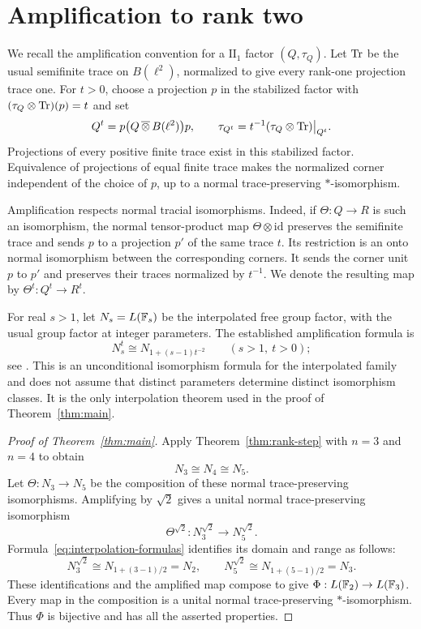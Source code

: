 \section{Amplification to rank two}\label{sec:amplification}
We recall the amplification convention for a $\mathrm{II}_1$ factor
$(Q,\tau_Q)$. Let $\operatorname{Tr}$ be the usual semifinite trace on $B(\ell^2)$,
normalized to give every rank-one projection trace one. For $t>0$,
choose a projection $p$ in the stabilized factor with
$(\tau_Q\otimes\operatorname{Tr})(p)=t$ and set
\[
 Q^t=p\bigl(Q\,\overline\otimes\,B(\ell^2)\bigr)p,
 \qquad
 \tau_{Q^t}=t^{-1}(\tau_Q\otimes\operatorname{Tr})\big|_{Q^t}.
\]
Projections of every positive finite trace exist in this stabilized
factor. Equivalence of projections of equal finite trace makes the
normalized corner independent of the choice of $p$, up to a normal
trace-preserving $*$-isomorphism.

Amplification respects normal tracial isomorphisms. Indeed, if
$\Theta:Q\to R$ is such an isomorphism, the normal tensor-product map
$\Theta\otimes\mathrm{id}$ preserves the semifinite trace and sends
$p$ to a projection $p'$ of the same trace $t$. Its restriction is an
onto normal isomorphism between the corresponding corners. It sends
the corner unit $p$ to $p'$ and preserves their traces normalized by
$t^{-1}$. We denote the resulting map by $\Theta^t:Q^t\to R^t$.

For real $s>1$, let $N_s=L(\mathbb F_s)$ be the interpolated free group factor,
with the usual group factor at integer parameters. The established
amplification formula is
\begin{equation}\label{eq:interpolation-formulas}
 N_s^t\cong N_{1+(s-1)t^{-2}}
 \qquad(s>1,\ t>0);
\end{equation}
see \cite[Theorem~2.4]{dykema1994}. This is an unconditional
isomorphism formula for the interpolated family and does not assume
that distinct parameters determine distinct isomorphism classes.
It is the only interpolation theorem used in the proof of
Theorem~\ref{thm:main}.

\begin{proof}[Proof of Theorem~\ref{thm:main}]
Apply Theorem~\ref{thm:rank-step} with $n=3$ and $n=4$ to obtain
\[
 N_3\cong N_4\cong N_5.
\]
Let $\Theta:N_3\to N_5$ be the composition of these normal
trace-preserving isomorphisms. Amplifying by $\sqrt2$ gives a
unital normal trace-preserving isomorphism
\[
 \Theta^{\sqrt2}:N_3^{\sqrt2}\longrightarrow N_5^{\sqrt2}.
\]
Formula~\eqref{eq:interpolation-formulas} identifies its domain and
range as follows:
\[
 N_3^{\sqrt2}\cong N_{1+(3-1)/2}=N_2,
 \qquad
 N_5^{\sqrt2}\cong N_{1+(5-1)/2}=N_3.
\]
These identifications and the amplified map compose to give
$\Phi:L(\mathbb F_2)\to L(\mathbb F_3)$. Every map in the composition is a unital
normal trace-preserving $*$-isomorphism. Thus $\Phi$ is bijective
and has all the asserted properties.
\end{proof}


